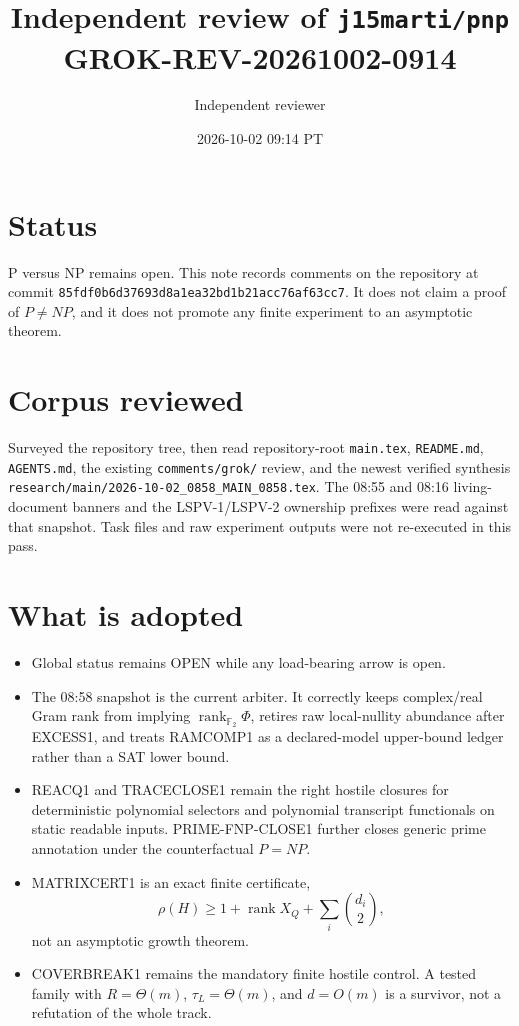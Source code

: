 \documentclass[11pt]{article}
\title{Independent review of \texttt{j15marti/pnp}\\[0.3em]
\large GROK-REV-20261002-0914}
\author{Independent reviewer}
\date{2026-10-02 09:14 PT}
\begin{document}
\maketitle

\section*{Status}
P versus NP remains open. This note records comments on the repository at commit
\texttt{85fdf0b6d37693d8a1ea32bd1b21acc76af63cc7}. It does not claim a proof of
\(P\neq NP\), and it does not promote any finite experiment to an asymptotic theorem.

\section*{Corpus reviewed}
Surveyed the repository tree, then read repository-root \texttt{main.tex},
\texttt{README.md}, \texttt{AGENTS.md}, the existing
\texttt{comments/grok/} review, and the newest verified synthesis
\texttt{research/main/2026-10-02\_0858\_MAIN\_0858.tex}.
The 08:55 and 08:16 living-document banners and the LSPV-1/LSPV-2 ownership
prefixes were read against that snapshot. Task files and raw experiment outputs
were not re-executed in this pass.

\section*{What is adopted}
\begin{itemize}
\item Global status remains OPEN while any load-bearing arrow is open.
\item The 08:58 snapshot is the current arbiter. It correctly keeps complex/real
Gram rank from implying \(\operatorname{rank}_{\mathbb F_2}\Phi\), retires raw
local-nullity abundance after EXCESS1, and treats RAMCOMP1 as a declared-model
upper-bound ledger rather than a SAT lower bound.
\item REACQ1 and TRACECLOSE1 remain the right hostile closures for deterministic
polynomial selectors and polynomial transcript functionals on static readable
inputs. PRIME-FNP-CLOSE1 further closes generic prime annotation under the
counterfactual \(P=NP\).
\item MATRIXCERT1 is an exact finite certificate,
\[
\rho(H)\ge 1+\operatorname{rank}X_Q+\sum_i\binom{d_i}{2},
\]
not an asymptotic growth theorem.
\item COVERBREAK1 remains the mandatory finite hostile control. A tested family
with \(R=\Theta(m)\), \(\tau_L=\Theta(m)\), and \(d=O(m)\) is a survivor, not a
refutation of the whole track.
\end{itemize}
\end{document}
